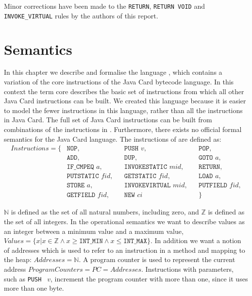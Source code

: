 Minor corrections have been made to the \texttt{RETURN}, \texttt{RETURN VOID} and \texttt{INVOKE\_VIRTUAL} rules by the authors of this report.
\section{Semantics}
\label{sec:semintro}
In this chapter we describe and formalise the language \jcl, which contains a variation of the core instructions of the Java Card bytecode language. In this context the term core describes the basic set of instructions from which all other Java Card instructions can be built. 
We created this language because it is easier to model the fewer instructions in this language, rather than all the instructions in Java Card.
The full set of Java Card instructions can be built from combinations of the instructions in \jcl.
Furthermore, there exists no official formal semantics for the Java Card language.
The instructions of \jcl are defined as:
\begin{align*}
  Instructions = \{
  & \texttt{NOP}, && \texttt{PUSH } v, && \texttt{POP}, \\ 
  & \texttt{ADD}, && \texttt{DUP}, && \texttt{GOTO } a, \\ 
  & \texttt{IF\_CMPEQ } a, && \texttt{INVOKESTATIC } mid, && \texttt{RETURN},\\ 
  & \texttt{PUTSTATIC } fid, && \texttt{GETSTATIC } fid, && \texttt{LOAD } a, \\
  & \texttt{STORE } a, && \texttt{INVOKEVIRTUAL } mid, && \texttt{PUTFIELD } fid,\\ 
  & \texttt{GETFIELD } fid, && \texttt{NEW } ci && \}
\end{align*}

$\mathbb{N}$ is defined as the set of all natural numbers, including zero, and $\mathbb{Z}$ is defined as the set of all integers.
In the operational semantics we want to describe values as an integer between a minimum value and a maximum value, $Values = \{ x | x \in \mathbb{Z} \wedge x \geq \texttt{INT\_MIN} \wedge x \leq \texttt{INT\_MAX} \}$.
In addition we want a notion of addresses which is used to refer to an instruction in a method and mapping to the heap: $Addresses  = \mathbb{N}$.
A program counter is used to represent the current address $ProgramCounters = PC = Addresses$. Instructions with parameters, such as \texttt{PUSH } $v$, increment the program counter with more than one, since it uses more than one byte. \\

